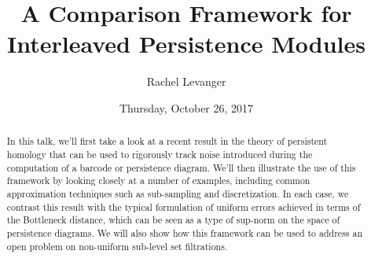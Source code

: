 \documentclass{UAmathtalk}
\author{Rachel Levanger}
\title{A Comparison Framework for\\ Interleaved Persistence Modules}
\date{Thursday, October 26, 2017}
\begin{document}
\maketitle

\begin{abstract}
In this talk, we'll first take a look at a recent result in the theory of persistent homology that can be used to rigorously track noise introduced during the computation of a barcode or persistence diagram. We'll then illustrate the use of this framework by looking closely at a number of examples, including common approximation techniques such as sub-sampling and discretization. In each case, we contrast this result with the typical formulation of uniform errors achieved in terms of the Bottleneck distance, which can be seen as a type of sup-norm on the space of persistence diagrams. We will also show how this framework can be used to address an open problem on non-uniform sub-level set filtrations.
\end{abstract}
\end{document}
